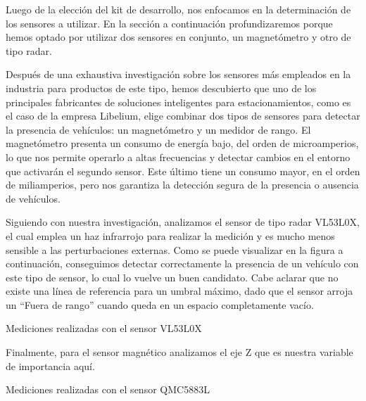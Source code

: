 
Luego de la elección del kit de desarrollo, nos enfocamos en la determinación de los sensores a utilizar. En la sección a continuación profundizaremos porque hemos optado por utilizar dos sensores en conjunto, un magnetómetro y otro de tipo radar.


Después de una exhaustiva investigación sobre los sensores más empleados en la industria para productos de este tipo, 
hemos descubierto que uno de los principales fabricantes de soluciones inteligentes para estacionamientos, 
como es el caso de la empresa Libelium, elige combinar dos tipos de sensores para detectar la presencia de vehículos: 
un magnetómetro y un medidor de rango. El magnetómetro presenta un consumo de energía bajo, del orden de microamperios, 
lo que nos permite operarlo a altas frecuencias y detectar cambios en el entorno que activarán el segundo sensor. 
Este último tiene un consumo mayor, en el orden de miliamperios, pero nos garantiza la detección segura de la presencia o ausencia de vehículos.

Siguiendo con nuestra investigación, analizamos el sensor de tipo radar VL53L0X, el cual emplea un haz infrarrojo para realizar la 
medición y es mucho menos sensible a las perturbaciones externas. Como se puede visualizar en la figura a continuación, conseguimos 
detectar correctamente la presencia de un vehículo con este tipo de sensor, lo cual lo vuelve un buen candidato. Cabe aclarar que no existe 
una línea de referencia para un umbral máximo, dado que el sensor arroja un “Fuera de rango” cuando queda en un espacio completamente vacío.

\begin{images}[\label{VL53L0X_PLOTS}]{Mediciones realizadas con el sensor VL53L0X}
\end{images}


Finalmente, para el sensor magnético analizamos el eje Z que es nuestra variable de importancia aquí.
\begin{images}[\label{QMC5883L_PLOT}]{Mediciones realizadas con el sensor QMC5883L}
\end{images}


